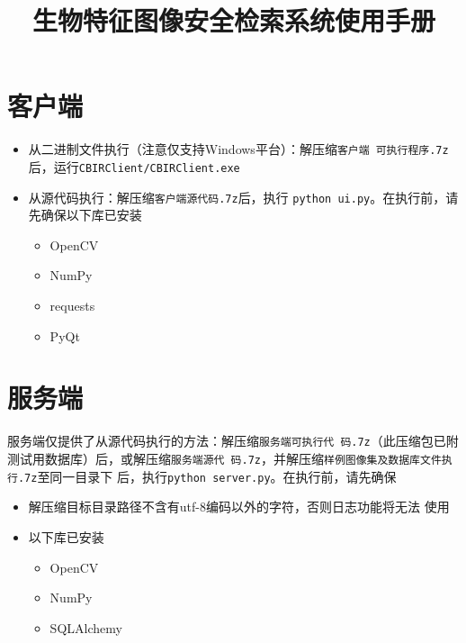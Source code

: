 \documentclass[utf8， 12pt, titlepage, a4paper]{ctexart}
\title{生物特征图像安全检索系统使用手册}
\begin{document}
\maketitle
\section*{客户端}
\begin{itemize}
\item 从二进制文件执行（注意仅支持Windows平台）：解压缩\texttt{客户端
    可执行程序.7z}后，运行\texttt{CBIRClient/CBIRClient.exe}
\item 从源代码执行：解压缩\texttt{客户端源代码.7z}后，执行
  \texttt{python ui.py}。在执行前，请先确保以下库已安装
  \begin{itemize}
  \item OpenCV
  \item NumPy
  \item requests
  \item PyQt
  \end{itemize}
\end{itemize}

\section*{服务端}
服务端仅提供了从源代码执行的方法：解压缩\texttt{服务端可执行代
  码.7z}（此压缩包已附测试用数据库）后，或解压缩\texttt{服务端源代
  码.7z}，并解压缩\texttt{样例图像集及数据库文件执行.7z}至同一目录下
后，执行\texttt{python server.py}。在执行前，请先确保
\begin{itemize}
\item 解压缩目标目录路径不含有utf-8编码以外的字符，否则日志功能将无法
  使用
\item 以下库已安装
  \begin{itemize}
  \item OpenCV
  \item NumPy
  \item SQLAlchemy
  \end{itemize}

\end{itemize}
\end{document}

